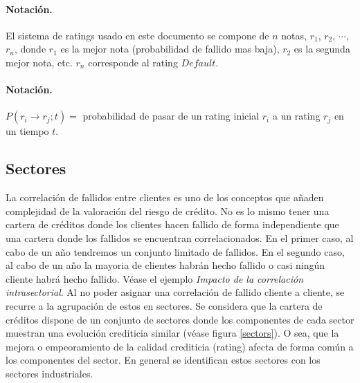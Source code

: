 \paragraph{Notaci\'on.} El sistema de ratings usado en este documento se 
compone de $n$ notas, $r_1$, $r_2$, $\cdots$, $r_n$, donde $r_1$ es la
mejor nota (probabilidad de fallido mas baja), $r_2$ es la segunda mejor nota, 
etc. $r_n$ corresponde al rating $Default$.

\paragraph{Notaci\'on.} $P(r_i \to r_j;t) =$ probabilidad de pasar de un 
rating inicial $r_i$ a un rating $r_j$ en un tiempo $t$.


\subsection{Sectores}

La correlaci\'on de fallidos entre clientes es uno de los conceptos que
a\~naden complejidad de la valoraci\'on del riesgo de cr\'edito. No es lo
mismo tener una cartera de cr\'editos donde los clientes hacen fallido 
de forma independiente que una cartera donde los fallidos se encuentran 
correlacionados. En el primer caso, al cabo de un a\~no tendremos un 
conjunto limitado de fallidos. En el segundo caso, al cabo de un a\~no la 
mayoria de clientes habr\'an hecho fallido o casi ning\'un cliente habr\'a
hecho fallido. V\'ease el ejemplo \emph{Impacto de la correlaci\'on intrasectorial}.
\newline
\newline
Al no poder asignar una correlaci\'on de fallido cliente a cliente, se recurre
a la agrupaci\'on de estos en sectores. Se considera que la cartera de 
cr\'editos dispone de un conjunto de sectores donde los componentes de cada 
sector muestran una evoluci\'on crediticia similar (v\'ease figura \ref{sectors}). 
O sea, que la mejora o empeoramiento de la calidad crediticia (rating) afecta 
de forma com\'un a los componentes del sector. En general se identifican 
estos sectores con los sectores industriales. 

